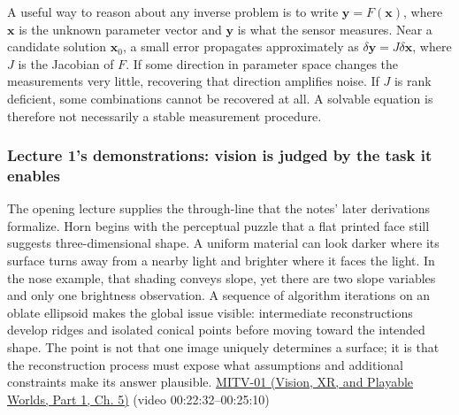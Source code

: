 A useful way to reason about any inverse problem is to write \(\mathbf{y}=F(\mathbf{x})\), where \(\mathbf{x}\) is the unknown parameter vector and \(\mathbf{y}\) is what the sensor measures. Near a candidate solution \(\mathbf{x}_0\), a small error propagates approximately as \(\delta\mathbf{y}=J\delta\mathbf{x}\), where \(J\) is the Jacobian of \(F\). If some direction in parameter space changes the measurements very little, recovering that direction amplifies noise. If \(J\) is rank deficient, some combinations cannot be recovered at all. A solvable equation is therefore not necessarily a stable measurement procedure.

\subsubsection{Lecture 1's demonstrations: vision is judged by the task it enables}\label{03-visual-computing-i-ch001-lecture-1s-demonstrations-vision-is-judged-by-the-task-it-enables}

\hypertarget{03-visual-computing-i-ch001-lecture-1s-demonstrations-vision-is-judged-by-the-task-it-enables}{}

The opening lecture supplies the through-line that the notes' later derivations formalize. Horn begins with the perceptual puzzle that a flat printed face still suggests three-dimensional shape. A uniform material can look darker where its surface turns away from a nearby light and brighter where it faces the light. In the nose example, that shading conveys slope, yet there are two slope variables and only one brightness observation. A sequence of algorithm iterations on an oblate ellipsoid makes the global issue visible: intermediate reconstructions develop ridges and isolated conical points before moving toward the intended shape. The point is not that one image uniquely determines a surface; it is that the reconstruction process must expose what assumptions and additional constraints make its answer plausible. \href{../07-Vision-XR-and-Playable-Worlds-P01/main.pdf\#nameddest=04-visual-computing-ii-ch036-mitv-01---introduction-to-machine-vision}{MITV-01 (Vision, XR, and Playable Worlds, Part 1, Ch. 5)} (video 00:22:32--00:25:10)

